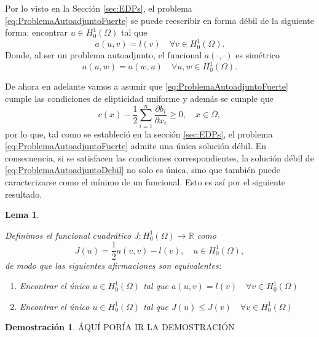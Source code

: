 \documentclass[a4paper,11pt,spanish, twoside, leqno]{tfg-uam}
\newtheorem{lema}[teor]{Lema}
\theoremstyle{definition}
\newtheorem{dem}[teor]{Demostración}
\begin{document}
Por lo visto en la Sección \ref{sec:EDPs}, el problema \eqref{eq:ProblemaAutoadjuntoFuerte} se puede reescribir en forma débil de la siguiente forma: encontrar $u\in H_0^1(\Omega)$ tal que
\begin{equation}\label{eq:ProblemaAutoadjuntoDebil}
    a(u,v) = l(v) \quad \forall v\in  H_0^1(\Omega).
\end{equation}
Donde, al ser un problema autoadjunto, el funcional $a(\cdot,\cdot)$ es simétrico
\begin{equation*}
    a(u,w) = a(w,u) \quad \forall u,w\in H_0^1(\Omega).
\end{equation*}

De ahora en adelante vamos a asumir que \eqref{eq:ProblemaAutoadjuntoFuerte} cumple las condiciones de elipticidad uniforme y además se cumple que
\begin{equation*}
    c(x) - \frac{1}{2} \sum_{i=1}^n \frac{\partial b_i}{\partial x_i} \geq 0, \quad x \in \overline{\Omega},
\end{equation*}
por lo que, tal como se estableció en la sección \ref{sec:EDPs}, el problema \eqref{eq:ProblemaAutoadjuntoFuerte} admite una única solución débil. En consecuencia, si se satisfacen las condiciones correspondientes, la solución débil de \eqref{eq:ProblemaAutoadjuntoDebil} no solo es única, sino que también puede caracterizarse como el mínimo de un funcional. Esto es así por el siguiente resultado.



\begin{lema} \label{lema:MinimoFuncion}
    
    Definimos el funcional cuadrático $J: H_0^1(\Omega) \to \mathbb{R}$ como
    \begin{equation*}
        J(u) = \frac{1}{2}a(v,v) - l(v), \quad u\in H_0^1(\Omega),
    \end{equation*}
    de modo que las siguientes afirmaciones son equivalentes:
    \begin{enumerate}
        \item Encontrar el único $u\in H_0^1(\Omega)$ tal que $a(u,v) = l(v) \quad \forall v\in H_0^1(\Omega)$
        \item Encontrar el único $u\in H_0^1(\Omega)$ tal que $J(u) \leq J(v) \quad \forall v\in H_0^1(\Omega)$
    \end{enumerate}
\end{lema}
\begin{dem}
    ÁQUÍ PORÍA IR LA DEMOSTRACIÓN
\end{dem}
\end{document}
